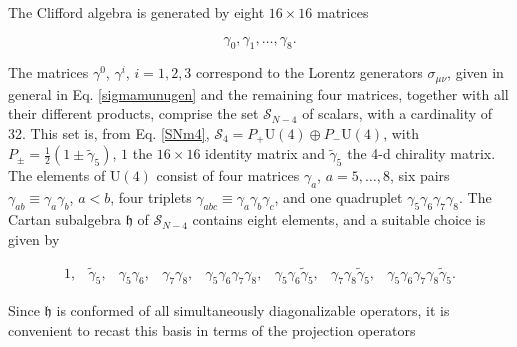 \documentclass[12pt]{article}
\renewcommand\[{\begin{dmath}}
\renewcommand\]{\end{dmath}}
\begin{document}
The Clifford algebra is generated by eight $16\times16$ matrices

\begin{equation}
\gamma_{0},\gamma_{1},\ldots,\gamma_{8}.\label{eq:2.5.1}
\end{equation}

\noindent The matrices $\gamma^{0}$, $\gamma^{i}$, $i=1,2,3$ correspond
to the Lorentz generators $\sigma_{\mu\nu}$, given in general in Eq. \ref{sigmamunugen} and the remaining four
matrices, together with all their different products, comprise
the set $ \mathcal{S}_{N-4}$ of scalars, with a cardinality of 32. This
set   is, from Eq. \ref{SNm4},   ${\textstyle \mathcal{S}_4=P_{+}\textrm{U}\left(4\right)\oplus P_{-}\textrm{U}\left(4\right)}$,
with $P_{\pm}=\frac{1}{2}\left(1\pm\tilde{\gamma}_{5}\right)$,
$1$ the $16\times16$ identity matrix and $\tilde{\gamma}_{5}$
the 4-d chirality matrix. The elements of $\textrm{U}\left(4\right)$
consist of four matrices $\gamma_{a}$, $a=5,\ldots,8$, six pairs
$\gamma_{ab}\equiv\gamma_{a}\gamma_{b}$, $a<b$, four triplets $\gamma_{abc}\equiv\gamma_{a}\gamma_{b}\gamma_{c}$,
and one quadruplet $\gamma_{5}\gamma_{6}\gamma_{7}\gamma_{8}$. The
Cartan subalgebra $\mathfrak{h}$ of $ \mathcal{S}_{N-4}$ contains eight
elements, and a suitable choice is given by

\begin{equation}
\begin{array}{cccccccc}
1, &\tilde{ {\gamma}}_{5}, & \gamma_{5}\gamma_{6}, & \gamma_{7}\gamma_{8}, & \gamma_{5}\gamma_{6}\gamma_{7}\gamma_{8}, & \gamma_{5}\gamma_{6}\tilde{\gamma}_{5}, & \gamma_{7}\gamma_{8}\tilde{\gamma}_{5}, & \gamma_{5}\gamma_{6}\gamma_{7}\gamma_{8}\tilde{\gamma}_{5}.\end{array}\label{eq:2.5.2}
\end{equation}

\noindent Since  $\mathfrak{h}$ is conformed of   all simultaneously diagonalizable operators, it is convenient to recast this basis in terms of
the projection operators
\end{document}
